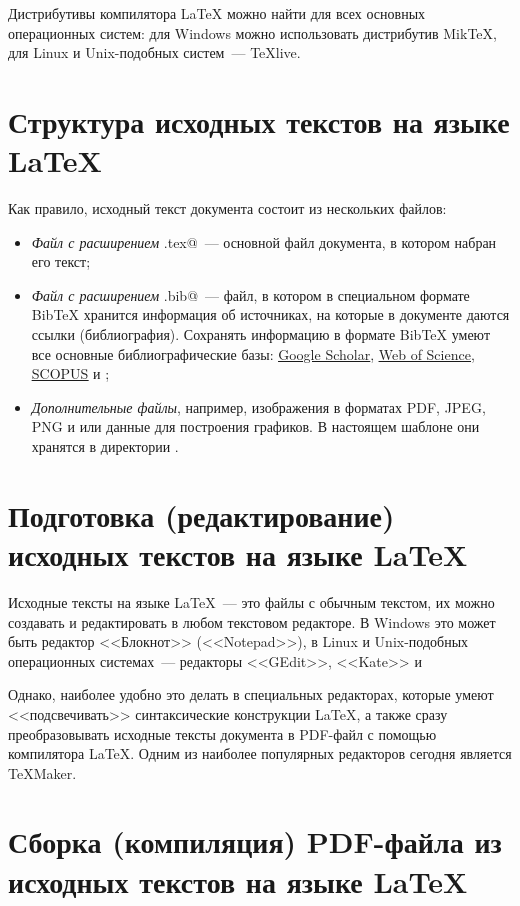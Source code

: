 \documentclass[a4paper, 14pt, reqno, oneside]{extbook}
\begin{document}
Дистрибутивы компилятора \LaTeX\xspace можно найти для всех основных операционных систем: для Windows можно использовать дистрибутив Mik\TeX, для Linux и \dr Unix-подобных систем~--- \TeX live.

\section{Структура исходных текстов на языке \LaTeX}

Как правило, исходный текст документа состоит из нескольких файлов:
\begin{itemize}
\item
    \emph{Файл с расширением} \verb@.tex@~--- основной файл документа, в котором набран его текст;
\item
    \emph{Файл с расширением} \verb@.bib@~--- файл, в котором в специальном формате Bib\TeX\xspace хранится информация об источниках, на которые в документе даются ссылки (библиография). Сохранять информацию в формате Bib\TeX\xspace умеют все основные библиографические базы: \href{https://scholar.google.com}{\color{blue}\uline{Google Scholar}}, \href{http://webofknowledge.com}{\color{blue}\uline{Web of Science}}, \href{http://scopus.com}{\color{blue}\uline{SCOPUS}} и \dr;
\item
    \emph{Дополнительные файлы}, например, изображения в форматах PDF, JPEG, PNG и \dr или данные для построения графиков. В настоящем шаблоне они хранятся в директории \verb@pictures@.
\end{itemize}

\section{Подготовка (редактирование) исходных текстов на языке \LaTeX}

Исходные тексты на языке \LaTeX~--- это файлы с обычным текстом, их можно создавать и редактировать в любом текстовом редакторе. В Windows это может быть редактор <<Блокнот>> (<<Notepad>>), в Linux и \dr Unix-подобных операционных системах~--- редакторы <<GEdit>>, <<Kate>> и \dr

Однако, наиболее удобно это делать в специальных редакторах, которые умеют <<подсвечивать>> синтаксические конструкции \LaTeX, а также сразу преобразовывать исходные тексты документа в PDF-файл с помощью компилятора \LaTeX. Одним из наиболее популярных редакторов сегодня является \TeX Maker.

\section{Сборка (компиляция) PDF-файла из исходных текстов на языке \LaTeX}
\label{sec:simple build}
\end{document}
